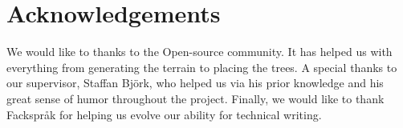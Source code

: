 \chapter*{Acknowledgements}
We would like to thanks to the Open-source community. 
It has helped us with everything from generating the terrain to placing the trees.
A special thanks to our supervisor, Staffan Björk, who helped us via his prior knowledge and his great sense of humor throughout the project.
Finally, we would like to thank Fackspråk for helping us evolve our ability for technical writing.